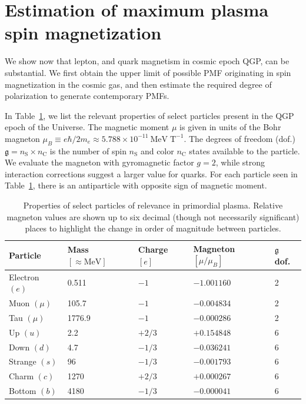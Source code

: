 \documentclass[epjST]{svjour}
\begin{document}
{\color{blue}\section{Estimation of maximum plasma spin magnetization}
\label{sec:estimation}
We show now that lepton, and quark magnetism in cosmic epoch QGP, can be substantial. We first obtain the upper limit of possible PMF originating in spin magnetization in the cosmic gas, and then estimate the required degree of polarization to generate contemporary PMFs.} In Table~\ref{tab:particle_properties}, we list the relevant properties of select particles present in the QGP epoch of the Universe. The magnetic moment \(\mu\) is given in units of the Bohr magneton \(\mu_{B}\equiv e\hbar/2m_{e}\approx5.788\times10^{-11}\ \mathrm{MeV\;T}^{-1}\). The degrees of freedom (dof.) \(\mathfrak{g}=n_\mathrm{S}\times n_\mathrm{C}\) is the number of spin \(n_\mathrm{S}\) and color \(n_\mathrm{C}\) states available to the particle. We evaluate the magneton with gyromagnetic factor \(g=2\), while strong interaction corrections suggest a larger value for quarks. For each particle seen in Table~\ref{tab:particle_properties}, there is an antiparticle with opposite sign of magnetic moment. 
\begin{table}%
\centering
\caption{{\color{blue}Properties of select particles of relevance in primordial plasma. Relative magneton values are shown up to six decimal (though not necessarily significant) places to highlight the change in order of magnitude between particles.}}
\label{tab:particle_properties}
\begin{tabular}{@{}lllll@{}}
\toprule
\textbf{Particle} & \textbf{Mass} \([\approx\mathrm{MeV}]\) & \textbf{Charge \([e]\)} & \textbf{Magneton} \([\mu/\mu_{B}]\) & \(\mathfrak{g}\) \textbf{dof.} \\ 
\midrule
Electron \((e)\) & 0.511 & \(-1\) & \(-1.001160\) & 2 \\
Muon \((\mu)\) & 105.7 & \(-1\) & \(-0.004834\) & 2 \\
Tau \((\mu)\) & 1776.9 & \(-1\) & \(-0.000286\) & 2 \\
\midrule
Up \((u)\) & 2.2 & \(+2/3\) & \(+0.154848\) & 6 \\
Down \((d)\) & 4.7 & \(-1/3\) & \(-0.036241\) & 6 \\
Strange \((s)\) & 96 & \(-1/3\) & \(-0.001793\) & 6 \\
Charm \((c)\) & 1270 & \(+2/3\) & \(+0.000267\) & 6 \\
Bottom \((b)\) & 4180 & \(-1/3\) & \(-0.000041\) & 6 \\
\bottomrule
\end{tabular}
\end{table}
\end{document}

